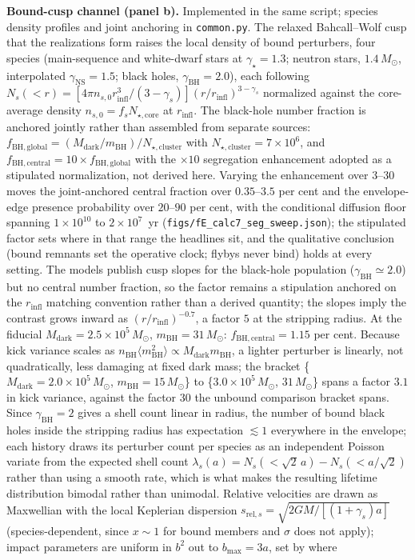 \documentclass[11pt]{article}
\newcommand{\msun}{\ensuremath{M_\odot}}
\begin{document}
\textbf{Bound-cusp channel (panel b).} Implemented in the same script; species density profiles and joint anchoring in \texttt{common.py}. The relaxed Bahcall--Wolf cusp that the \citet{GonzalezPrieto2025} realizations form raises the local density of bound perturbers, four species (main-sequence and white-dwarf stars at $\gamma_{\star} = 1.3$; neutron stars, $1.4\,\msun$, interpolated $\gamma_{\mathrm{NS}} = 1.5$; black holes, $\gamma_{\mathrm{BH}} = 2.0$), each following $N_{s}(<r) = [4\pi n_{s,0}r_{\mathrm{infl}}^{3}/(3-\gamma_{s})](r/r_{\mathrm{infl}})^{3-\gamma_{s}}$ normalized against the core-average density $n_{s,0} = f_{s}N_{\star,\mathrm{core}}$ at $r_{\mathrm{infl}}$. The black-hole number fraction is anchored jointly rather than assembled from separate sources: $f_{\mathrm{BH,global}} = (M_{\mathrm{dark}}/m_{\mathrm{BH}})/N_{\star,\mathrm{cluster}}$ with $N_{\star,\mathrm{cluster}} = 7\times10^{6}$, and $f_{\mathrm{BH,central}} = 10\times f_{\mathrm{BH,global}}$ with the $\times 10$ segregation enhancement adopted as a stipulated normalization, not derived here. Varying the enhancement over $3$--$30$ moves the joint-anchored central fraction over $0.35$--$3.5$ per cent and the envelope-edge presence probability over $20$--$90$ per cent, with the conditional diffusion floor spanning $1\times10^{10}$ to $2\times10^{7}$~yr (\texttt{figs/fE\_calc7\_seg\_sweep.json}); the stipulated factor sets where in that range the headlines sit, and the qualitative conclusion (bound remnants set the operative clock; flybys never bind) holds at every setting. The \citet{GonzalezPrieto2025} models publish cusp slopes for the black-hole population ($\gamma_{\mathrm{BH}} \simeq 2.0$) but no central number fraction, so the factor remains a stipulation anchored on the $r_{\mathrm{infl}}$ matching convention rather than a derived quantity; the slopes imply the contrast grows inward as $(r/r_{\mathrm{infl}})^{-0.7}$, a factor $5$ at the stripping radius. At the fiducial $M_{\mathrm{dark}} = 2.5\times10^{5}\,\msun$, $m_{\mathrm{BH}} = 31\,\msun$: $f_{\mathrm{BH,central}} = 1.15$ per cent. Because kick variance scales as $n_{\mathrm{BH}}\langle m_{\mathrm{BH}}^{2}\rangle \propto M_{\mathrm{dark}}m_{\mathrm{BH}}$, a lighter perturber is linearly, not quadratically, less damaging at fixed dark mass; the bracket \{$M_{\mathrm{dark}} = 2.0\times10^{5}\,\msun$, $m_{\mathrm{BH}} = 15\,\msun$\} to \{$3.0\times10^{5}\,\msun$, $31\,\msun$\} spans a factor $3.1$ in kick variance, against the factor $30$ the unbound comparison bracket spans. Since $\gamma_{\mathrm{BH}} = 2$ gives a shell count linear in radius, the number of bound black holes inside the stripping radius has expectation $\lesssim 1$ everywhere in the envelope; each history draws its perturber count per species as an independent Poisson variate from the expected shell count $\lambda_{s}(a) = N_{s}(<\sqrt2\,a) - N_{s}(<a/\sqrt2)$ rather than using a smooth rate, which is what makes the resulting lifetime distribution bimodal rather than unimodal. Relative velocities are drawn as Maxwellian with the local Keplerian dispersion $s_{\mathrm{rel},s} = \sqrt{2GM/[(1+\gamma_{s})a]}$ (species-dependent, since $x \sim 1$ for bound members and $\sigma$ does not apply); impact parameters are uniform in $b^{2}$ out to $b_{\max} = 3a$, set by where 
\end{document}
